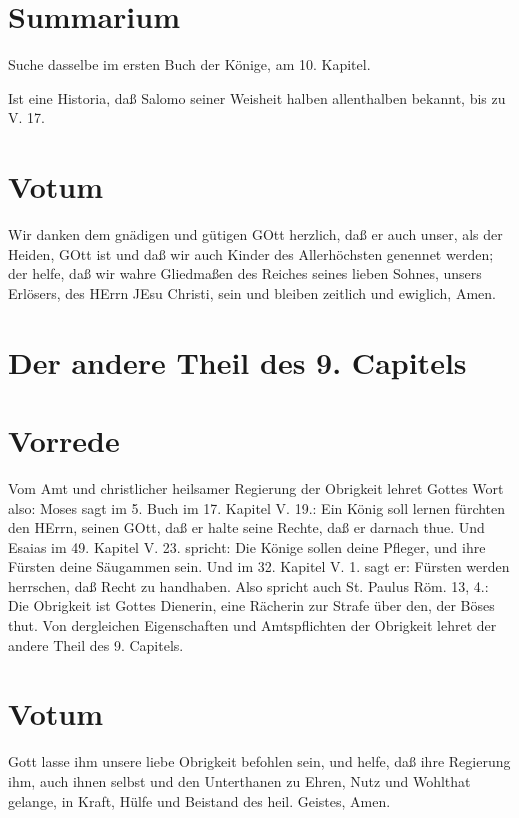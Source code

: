 \section{Summarium}

Suche dasselbe im ersten Buch der Könige, am 10. Kapitel.

Ist eine Historia, daß Salomo seiner Weisheit halben allenthalben bekannt, bis zu V. 17.

\section{Votum}

Wir danken dem gnädigen und gütigen GOtt herzlich, daß er auch unser, als der Heiden, GOtt ist und daß wir auch Kinder des Allerhöchsten genennet werden; der helfe, daß wir wahre Gliedmaßen des Reiches seines lieben Sohnes, unsers Erlösers, des HErrn JEsu Christi, sein und bleiben zeitlich und ewiglich, Amen.

\section[Der andere Theil des 9. Capitels]{Der andere Theil des 9. Capitels}

\section{Vorrede}

Vom Amt und christlicher heilsamer Regierung der Obrigkeit lehret Gottes Wort also: Moses sagt im 5. Buch im 17. Kapitel V. 19.: Ein König soll lernen fürchten den HErrn, seinen GOtt, daß er halte seine Rechte, daß er darnach thue. Und Esaias im 49. Kapitel V. 23. spricht: Die Könige sollen deine Pfleger, und ihre Fürsten deine Säugammen sein. Und im 32. Kapitel V. 1. sagt er: Fürsten werden herrschen, daß Recht zu handhaben. Also spricht auch St. Paulus Röm. 13, 4.: Die Obrigkeit ist Gottes Dienerin, eine Rächerin zur Strafe über den, der Böses thut. Von dergleichen Eigenschaften und Amtspflichten der Obrigkeit lehret der andere Theil des 9. Capitels.

\section{Votum}

Gott lasse ihm unsere liebe Obrigkeit befohlen sein, und helfe, daß ihre Regierung ihm, auch ihnen selbst und den Unterthanen zu Ehren, Nutz und Wohlthat gelange, in Kraft, Hülfe und Beistand des heil. Geistes, Amen.

